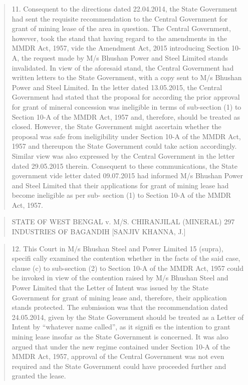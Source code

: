 \documentclass[12pt,a4paper]{article}
\newenvironment{judgequote}
  {\begin{quote}\small}
  {\end{quote}}
\begin{document}
\begin{judgequote}
11. Consequent to the directions dated 22.04.2014, the State Government
had sent the requisite recommendation to the Central Government for grant
of mining lease of the area in question. The Central Government, however,
took the stand that having regard to the amendments in the MMDR Act,
1957, vide the Amendment Act, 2015 introducing Section 10-A, the request
made by M/s Bhushan Power and Steel Limited stands invalidated. In
view of the aforesaid stand, the Central Government had written letters to
the State Government, with a copy sent to M/s Bhushan Power and Steel
Limited. In the letter dated 13.05.2015, the Central Government had stated
that the proposal for according the prior approval for grant of mineral
concession was ineligible in terms of sub-section (1) to Section 10-A of
the MMDR Act, 1957 and, therefore, should be treated as closed. However,
the State Government might ascertain whether the proposal was safe from
ineligibility under Section 10-A of the MMDR Act, 1957 and thereupon
the State Government could take action accordingly. Similar view was also
expressed by the Central Government in the letter dated 29.05.2015 therein.
Consequent to these communications, the State government vide letter dated
09.07.2015 had informed M/s Bhushan Power and Steel Limited that their
applications for grant of mining lease had become ineligible as per sub-
section (1) to Section 10-A of the MMDR Act, 1957.
\end{judgequote}



\begin{judgequote}
STATE OF WEST BENGAL v. M/S. CHIRANJILAL (MINERAL) 297
INDUSTRIES OF BAGANDIH [SANJIV KHANNA, J.]
\end{judgequote}

\begin{judgequote}
12. This Court in M/s Bhushan Steel and Power Limited 15 (supra),
specifi cally examined the contention whether in the facts of the said case,
clause (c) to sub-section (2) to Section 10-A of the MMDR Act, 1957 could
be invoked in view of the contention raised by M/s Bhushan Steel and
Power Limited that the Letter of Intent was issued by the State Government
for grant of mining lease and, therefore, their application stands protected.
The submission was that the recommendation dated 24.05.2014, given by
the State Government should be treated as a Letter of Intent by ``whatever
name called'', as it signifi es the intention to grant mining lease insofar as
the State Government is concerned. It was also argued that under the new
regime contained under Section 10-A of the MMDR Act, 1957, approval of
the Central Government was not even required and the State Government
could have proceeded further and granted the lease.
\end{judgequote}
\end{document}
